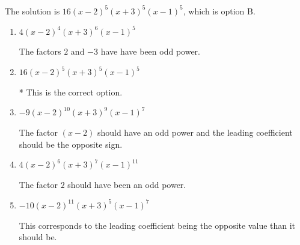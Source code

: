 \documentclass{extbook}[14pt]
\begin{document}
\begin{enumerate}
{The solution is \( 16(x - 2)^{5} (x + 3)^{5} (x - 1)^{5} \), which is option B.\begin{enumerate}[label=\Alph*.]
\item \( 4(x - 2)^{4} (x + 3)^{6} (x - 1)^{5} \)

The factors $2$ and $-3$ have have been odd power.
\item \( 16(x - 2)^{5} (x + 3)^{5} (x - 1)^{5} \)

* This is the correct option.
\item \( -9(x - 2)^{10} (x + 3)^{9} (x - 1)^{7} \)

The factor $(x - 2)$ should have an odd power and the leading coefficient should be the opposite sign.
\item \( 4(x - 2)^{6} (x + 3)^{7} (x - 1)^{11} \)

The factor $2$ should have been an odd power.
\item \( -10(x - 2)^{11} (x + 3)^{5} (x - 1)^{7} \)

This corresponds to the leading coefficient being the opposite value than it should be.
\end{enumerate}

}
\end{enumerate}
\end{document}
